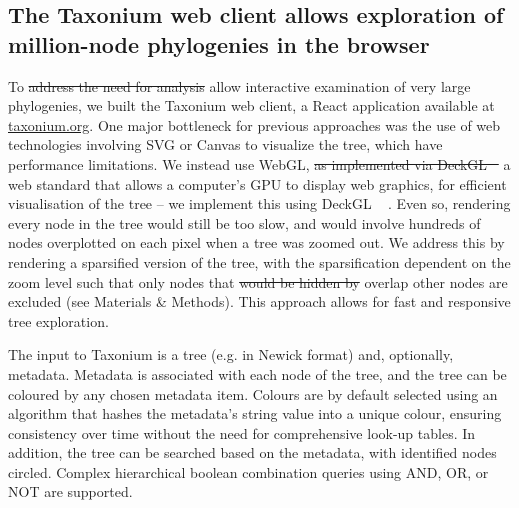 \documentclass[twocolumn]{bioRxiv}
\providecommand{\DIFadd}[1]{{\protect\color{teal}#1}}
\providecommand{\DIFdel}[1]{{\protect\color{red}\sout{#1}}}
\providecommand{\DIFaddbegin}{}
\providecommand{\DIFaddend}{}
\providecommand{\DIFdelbegin}{}
\providecommand{\DIFdelend}{}
\begin{document}
\subsection*{The Taxonium web client allows exploration of million-node phylogenies in the browser}

To \DIFdelbegin \DIFdel{address the need for analysis }\DIFdelend \DIFaddbegin \DIFadd{allow interactive examination }\DIFaddend of very large phylogenies, we built the Taxonium web client, a React application available at \href{http://taxonium.org}{taxonium.org}. One major bottleneck for previous approaches was the use of web technologies involving SVG or Canvas to visualize the tree, which have performance limitations. We instead use WebGL, \DIFdelbegin \DIFdel{as implemented via DeckGL \mbox{%
\citep{deckgl}}\hspace{0pt}%
}\DIFdelend \DIFaddbegin \DIFadd{a web standard that allows a computer's GPU to display web graphics}\DIFaddend , for efficient visualisation of the tree \DIFaddbegin \DIFadd{-- we implement this using DeckGL \mbox{%
\citep{deckgl}}\hspace{0pt}%
}\DIFaddend . Even so, rendering every node in the tree would still be too slow, and would involve hundreds of nodes overplotted on each pixel when a tree was zoomed out. We address this by rendering a sparsified version of the tree, with the sparsification dependent on the zoom level such that only nodes that \DIFdelbegin \DIFdel{would be hidden by }\DIFdelend \DIFaddbegin \DIFadd{overlap }\DIFaddend other nodes are excluded \DIFaddbegin \DIFadd{(see Materials \& Methods)}\DIFaddend . This approach allows for fast and responsive tree exploration.

The input to Taxonium is a tree (e.g. in Newick format) and, optionally, metadata. Metadata is associated with each node of the tree, and the tree can be coloured by any chosen metadata item. Colours are by default selected using an algorithm that hashes the metadata's string value into a unique colour, ensuring consistency over time without the need for comprehensive look-up tables. In addition, the tree can be searched based on the metadata, with identified nodes circled. Complex hierarchical boolean combination queries using AND, OR, or NOT  are supported.
\end{document}
